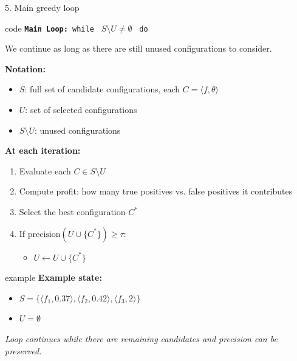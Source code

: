 \documentclass[8pt]{beamer} %
\begin{document}
\begin{frame}{5. Main greedy loop}
	
	\begin{beamercolorbox}[rounded=true, shadow=true, leftskip=1em, rightskip=1em]{code}	
	\texttt{\textbf{Main Loop:} while } $S \setminus U \neq \emptyset$ \texttt{ do}
	\end{beamercolorbox}
	\vspace{0.5em}
	We continue as long as there are still unused configurations to consider.
	
	\vspace{0.5em}
	\textbf{Notation:}
	\begin{itemize}
		\item $S$: full set of candidate configurations, each $C = \langle f, \theta \rangle$
		\item $U$: set of selected configurations
		\item $S \setminus U$: unused configurations
	\end{itemize}
	
	\vspace{0.5em}
	\textbf{At each iteration:}
	\begin{enumerate}
		\item Evaluate each $C \in S \setminus U$
		\item Compute profit: how many true positives vs. false positives it contributes
		\item Select the best configuration $C^*$
		\item If $\text{precision}(U \cup \{C^*\}) \geq \tau$:
		\begin{itemize}
			\item[] \texttt{$U \leftarrow U \cup \{C^*\}$}
		\end{itemize}
	\end{enumerate}
	
	\vspace{0.5em}
	\begin{beamercolorbox}[rounded=true, shadow=true, leftskip=1em, rightskip=1em]{example}	
		\textbf{Example state:}
		\begin{itemize}
			\item $S = \{ \langle f_1, 0.37 \rangle, \langle f_2, 0.42 \rangle, \langle f_3, 2 \rangle \}$
			\item $U = \emptyset$
		\end{itemize}
		
		\textit{Loop continues while there are remaining candidates and precision can be preserved.}
	\end{beamercolorbox}
		
\end{frame}
\end{document}
